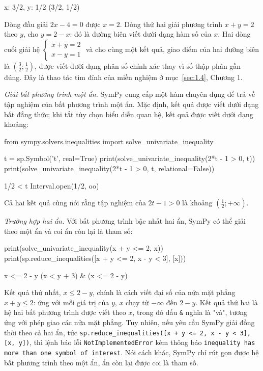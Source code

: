 \documentclass[12pt,a4paper]{report}
\begin{document}
\begin{ketquabox}
{x: 3/2, y: 1/2}
{(3/2, 1/2)}
\end{ketquabox}

Dòng đầu giải $2x-4=0$ được $x=2$. Dòng thứ hai giải phương trình $x+y=2$ theo $y$, cho $y=2-x$: đó là đường biên viết dưới dạng hàm số của $x$. Hai dòng cuối giải hệ $\begin{cases}x+y=2\\x-y=1\end{cases}$ và cho cùng một kết quả, giao điểm của hai đường biên là $\left(\frac{3}{2};\frac{1}{2}\right)$, được viết dưới dạng phân số chính xác thay vì số thập phân gần đúng. Đây là thao tác tìm đỉnh của miền nghiệm ở mục~\ref*{sec:1.4}, Chương 1.

\textit{Giải bất phương trình một ẩn.} SymPy cung cấp một hàm chuyên dụng để trả về tập nghiệm của bất phương trình một ẩn. Mặc định, kết quả được viết dưới dạng bất đẳng thức; khi tắt tùy chọn biểu diễn quan hệ, kết quả được viết dưới dạng khoảng:

\begin{madoanbox}
from sympy.solvers.inequalities import solve_univariate_inequality

t = sp.Symbol('t', real=True)
print(solve_univariate_inequality(2*t - 1 > 0, t))
print(solve_univariate_inequality(2*t - 1 > 0, t, relational=False))
\end{madoanbox}

\begin{ketquabox}
1/2 < t
Interval.open(1/2, oo)
\end{ketquabox}

Cả hai kết quả cùng nói rằng tập nghiệm của $2t-1>0$ là khoảng $\left(\frac{1}{2};+\infty\right)$.

\textit{Trường hợp hai ẩn.} Với bất phương trình bậc nhất hai ẩn, SymPy có thể giải theo một ẩn và coi ẩn còn lại là tham số:

\begin{madoanbox}
print(solve_univariate_inequality(x + y <= 2, x))
print(sp.reduce_inequalities([x + y <= 2, x - y < 3], [x]))
\end{madoanbox}

\begin{ketquabox}
x <= 2 - y
(x < y + 3) & (x <= 2 - y)
\end{ketquabox}

Kết quả thứ nhất, $x\le 2-y$, chính là cách viết đại số của nửa mặt phẳng $x+y\le 2$: ứng với mỗi giá trị của $y$, $x$ chạy từ $-\infty$ đến $2-y$. Kết quả thứ hai là hệ hai bất phương trình được viết theo $x$, trong đó dấu \texttt{\&} nghĩa là "và", tương ứng với phép giao các nửa mặt phẳng. Tuy nhiên, nếu yêu cầu SymPy giải đồng thời theo cả hai ẩn, tức \texttt{sp.reduce\_inequalities([x + y <= 2, x - y < 3], [x, y])}, thì lệnh báo lỗi \texttt{NotImplementedError} kèm thông báo \texttt{inequality has more than one symbol of interest}. Nói cách khác, SymPy chỉ rút gọn được hệ bất phương trình theo một ẩn, ẩn còn lại được coi là tham số.
\end{document}
